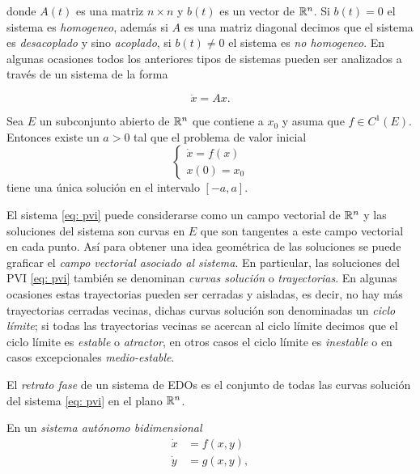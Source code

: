 donde $A(t)$ es una matriz $n \times n$ y $b(t)$ es un vector de ${\mathbb{R}}^{n}$. Si $b(t) = 0$ el sistema es \textit{homogeneo}, además si $A$ es una matriz diagonal decimos que el sistema es \textit{desacoplado} y sino \textit{acoplado}, si $b(t) \neq 0$ el sistema es \textit{no homogeneo}. En algunas ocasiones todos los anteriores tipos de sistemas pueden ser analizados a través de un sistema de la forma

\begin{equation}
	\dot{x} = Ax.
	\label{eq: sisLinAuto}
\end{equation}

\begin{teo}\label{teo: Existencia y unicidad}
	Sea $E$ un subconjunto abierto de ${\mathbb{R}}^{n}$ que contiene a $x_{0}$ y asuma que $f \in C^{1}(E)$. Entonces existe un $a>0$ tal que el problema de valor inicial 
	\begin{equation}
		\left\{
		\begin{aligned}
			\dot{x} = f(x) \\
			x(0) = x_{0}
		\end{aligned}
		\right.
		\label{eq: pvi}
	\end{equation}
	tiene una única solución en el intervalo $[-a,a]$.
\end{teo}

El sistema \eqref{eq: pvi} puede considerarse como un campo vectorial de ${\mathbb{R}}^{n}$ y las soluciones del sistema son curvas en $E$ que son tangentes a este campo vectorial en cada punto. Así para obtener una idea geométrica de las soluciones se puede graficar el \textit{campo vectorial asociado al sistema}. En particular, las soluciones del PVI \eqref{eq: pvi} también se denominan \textit{curvas solución} o \textit{trayectorias}. En algunas ocasiones estas trayectorias pueden ser cerradas y aisladas, es decir, no hay más trayectorias cerradas vecinas, dichas curvas solución son denominadas un \textit{ciclo límite}; si todas las trayectorias vecinas se acercan al ciclo límite decimos que el ciclo límite es \textit{estable} o \textit{atractor}, en otros casos el ciclo límite es \textit{inestable} o en casos excepcionales \textit{medio-estable}.

El \textit{retrato fase} de un sistema de EDOs es el conjunto de todas las curvas solución del sistema \eqref{eq: pvi} en el plano ${\mathbb{R}}^{n}$.

En un \textit{sistema autónomo bidimensional}
\begin{equation}
	\begin{aligned}
		\dot{x} &= f(x, y) \\
		\dot{y} &= g(x, y),
	\end{aligned}
	\label{eq: sisAutBid}
\end{equation}

